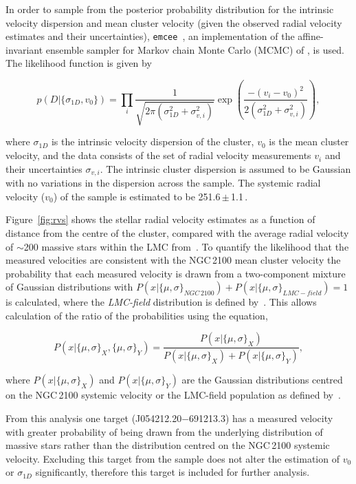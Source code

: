 In order to sample from the posterior probability distribution for the intrinsic velocity dispersion and mean cluster velocity (given the observed radial velocity estimates and their uncertainties), \texttt{emcee}~\citep{2013PASP..125..306F},
an implementation of the affine-invariant ensemble sampler for Markov chain Monte Carlo (MCMC) of \cite{2010CAMCS.5..65G}, is used. The likelihood function is given by

\begin{equation}
p(D|\{\sigma_{1D}, v_0\}) = \prod_i \frac{1}{\sqrt{2 \pi (\sigma_{1D}^2+ \sigma_{v, i}^2)}}  \exp{\left(\frac{-(v_i - v_0)^2}{2 (\sigma_{1D}^2+ \sigma_{v, i}^2)}\right)},
\label{eq:like}
\end{equation}

\noindent where $\sigma_{1D}$ is the intrinsic velocity dispersion of the cluster, $v_0$ is the mean cluster velocity, and the data consists of the set of radial velocity measurements $v_i$ and their uncertainties $\sigma_{v, i}$.
The intrinsic cluster dispersion is assumed to be Gaussian with no variations in the dispersion across the sample.
The systemic radial velocity ($v_0$) of the sample is estimated to be 251.6\,$\pm$\,1.1\,\kms.

Figure~\ref{fig:rvs} shows the stellar radial velocity estimates as a function of distance from the centre of the cluster, compared with the average radial velocity of $\sim$200 massive stars within the LMC from~\citet[][green dashed line]{2015A&A...584A...5E}.
To quantify the likelihood that the measured velocities are consistent with the NGC\,2100 mean cluster velocity the probability that each measured velocity is drawn from a two-component mixture of Gaussian distributions with
$P(x|\{\mu, \sigma\}_{NGC\,2100}) + P(x|\{\mu, \sigma\}_{LMC-field}) = 1$ is calculated,
where the {\it LMC-field} distribution is defined by~\cite{2015A&A...584A...5E}.
This allows calculation of the ratio of the probabilities using the equation,

\begin{equation}
    P(x|\{\mu, \sigma\}_X,\{\mu, \sigma\}_Y) = \frac{P(x|\{\mu, \sigma\}_X)}{P(x|\{\mu, \sigma\}_X) + P(x|\{\mu, \sigma\}_Y)},
\end{equation}

where $P(x|\{\mu, \sigma\}_X)$ and $P(x|\{\mu, \sigma\}_Y)$ are the Gaussian distributions centred on the NGC\,2100 systemic velocity or the LMC-field population as defined by~\cite{2015A&A...584A...5E}.

From this analysis one target (J054212.20$-$691213.3) has a measured velocity with greater probability of being drawn from the underlying distribution of massive stars rather than the distribution centred on the NGC\,2100 systemic velocity.
Excluding this target from the sample does not alter the estimation of $v_0$ or $\sigma_{1D}$ significantly, therefore this target is included for further analysis.

